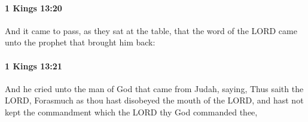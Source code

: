 		\paragraph{1 Kings 13:20} %
			\label{1KINGS-13-20}

			And it came to pass, as they sat at the table, that the word of the LORD came unto the prophet that brought him back:


		\paragraph{1 Kings 13:21} %
			\label{1KINGS-13-21}

			And he cried unto the man of God that came from Judah, saying, Thus saith the LORD, Forasmuch as thou hast disobeyed the mouth of the LORD, and hast not kept the commandment which the LORD thy God commanded thee,


